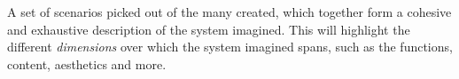 \begin{definition} \label{def:scenario_corpus} 
  A set of scenarios picked out of the many created, which together form a cohesive and exhaustive description of the system imagined. This will highlight the different \emph{dimensions} over which the system imagined spans, such as the functions, content, aesthetics and more. \cite[p. 67-68]{benyon_14}
\end{definition}